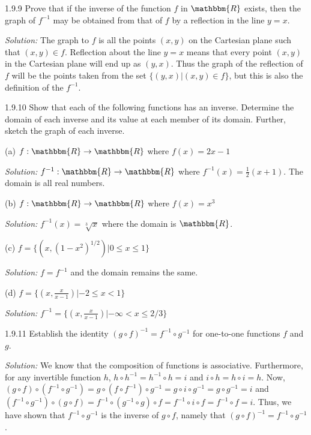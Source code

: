 \documentclass{letter}
\newcommand{\tmtextit}[1]{{\itshape{#1}}}
\begin{document}
1.9.9 Prove that if the inverse of the function $f$ in $\mathbbm{R}$ exists,
then the graph of $f^{- 1}$ may be obtained from that of $f$ by a reflection
in the line $y = x$.

\tmtextit{Solution:} The graph to $f$ is all the points $(x, y)$ on the
Cartesian plane such that $(x, y) \in f$. Reflection about the line $y = x$
means that every point $(x, y)$ in the Cartesian plane will end up as $(y,
x)$. Thus the graph of the reflection of $f$ will be the points taken from the
set $\{(y, x) | (x, y) \in f\}$, but this is also the definition of the $f^{-
1}$.

1.9.10 Show that each of the following functions has an inverse. Determine the
domain of each inverse and its value at each member of its domain. Further,
sketch the graph of each inverse.

(a) $f : \mathbbm{R} \rightarrow \mathbbm{R}$ where $f (x) = 2 x - 1$

\tmtextit{Solution:} $f^{- 1} : \mathbbm{R} \rightarrow \mathbbm{R}$ where
$f^{- 1} (x) = \frac{1}{2} (x + 1)$. The domain is all real numbers.

(b) $f : \mathbbm{R} \rightarrow \mathbbm{R}$ where $f (x) = x^3$

\tmtextit{Solution:} $f^{- 1} (x) = \sqrt[3]{x}$ where the domain is
$\mathbbm{R}$.

(c) $f =\{(x, (1 - x^2)^{1 / 2}) | 0 \leq x \leq 1\}$

\tmtextit{Solution:} $f = f^{- 1}$ and the domain remains the same.

(d) $f =\{(x, \frac{x}{x - 1}) | - 2 \leq x < 1\}$

\tmtextit{Solution:} $f^{- 1} =\{(x, \frac{x}{x - 1}) | - \infty < x \leq 2 /
3\}$

1.9.11 Establish the identity $(g \circ f)^{- 1} = f^{- 1} \circ g^{- 1}$ for
one-to-one functions $f$ and $g$.

\tmtextit{Solution:} We know that the composition of functions is associative.
Furthermore, for any invertible function $h$, $h \circ h^{- 1} = h^{- 1} \circ
h = i$ and $i \circ h = h \circ i = h$. Now, $(g \circ f) \circ (f^{- 1} \circ
g^{- 1}) = g \circ (f \circ f^{- 1}) \circ g^{- 1} = g \circ i \circ g^{- 1} =
g \circ g^{- 1} = i$ and $(f^{- 1} \circ g^{- 1}) \circ (g \circ f) = f^{- 1}
\circ (g^{- 1} \circ g) \circ f = f^{- 1} \circ i \circ f = f^{- 1} \circ f =
i$. Thus, we have shown that $f^{- 1} \circ g^{- 1}$ is the inverse of $g
\circ f$, namely that $(g \circ f)^{- 1} = f^{- 1} \circ g^{- 1}$.
\end{document}
